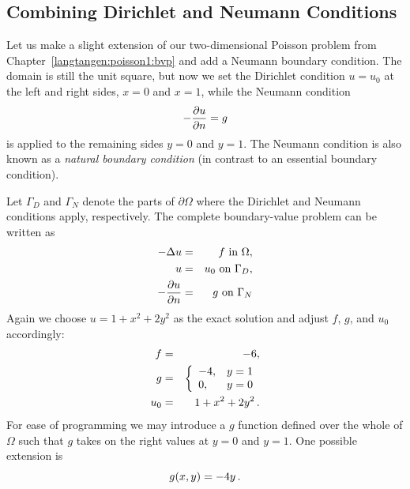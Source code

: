 \subsection{Combining Dirichlet and Neumann Conditions}
\label{langtangen:poisson1:DN}

Let us make a slight extension of our two-dimensional Poisson problem
from Chapter~\ref{langtangen:poisson1:bvp}
and add a Neumann boundary condition. The domain is still
the unit square, but now we set the Dirichlet condition
$u=u_0$ at the left and right sides,
$x=0$ and $x=1$, while the Neumann condition
\[ -{\partial u\over\partial n}=g \]
is applied to the remaining
sides $y=0$ and $y=1$.
The Neumann condition is also known as a \emph{natural boundary condition}
(in contrast to an essential boundary condition).

Let $\Gamma_D$ and $\Gamma_N$
denote the parts of $\partial\Omega$ where the Dirichlet and Neumann
conditions apply, respectively.
The complete boundary-value problem can be written as
\begin{eqnarray}
    - \Delta u &=& f \mbox{ in } \Omega,  \\ %
    u &=& u_0 \mbox{ on } \Gamma_D,       \\ %
    - {\partial u\over\partial n} &=& g \mbox{ on } \Gamma_N  %
\end{eqnarray}
Again we choose $u=1+x^2 + 2y^2$ as the exact solution and adjust $f$, $g$, and
$u_0$ accordingly:
\begin{eqnarray*}
f &=& -6,\\
g &=& \left\lbrace\begin{array}{ll}
-4, & y=1\\
0,  & y=0
\end{array}\right.\\
u_0 &=& 1 + x^2 + 2y^2\thinspace .
\end{eqnarray*}
For ease of programming we may introduce a $g$ function defined over the whole
of $\Omega$ such that $g$ takes on the right values at $y=0$ and
$y=1$. One possible extension is
\[ g(x,y) = -4y\thinspace .\]

